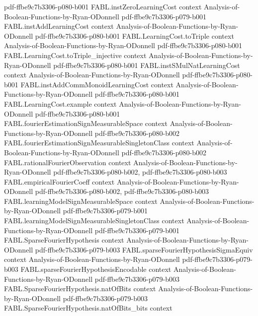 \begin{theorem}
{    pdf-ffbe9c7b3306-p080-b001}
\proofstep
  {FABL.instZeroLearningCost}
  {context}
  {Analysis-of-Boolean-Functions-by-Ryan-ODonnell}
  {pdf-ffbe9c7b3306-p079-b001}
\proofstep
  {FABL.instAddLearningCost}
  {context}
  {Analysis-of-Boolean-Functions-by-Ryan-ODonnell}
  {pdf-ffbe9c7b3306-p080-b001}
\proofstep
  {FABL.LearningCost.toTriple}
  {context}
  {Analysis-of-Boolean-Functions-by-Ryan-ODonnell}
  {pdf-ffbe9c7b3306-p080-b001}
\proofstep
  {FABL.LearningCost.toTriple_injective}
  {context}
  {Analysis-of-Boolean-Functions-by-Ryan-ODonnell}
  {pdf-ffbe9c7b3306-p080-b001}
\proofstep
  {FABL.instSMulNatLearningCost}
  {context}
  {Analysis-of-Boolean-Functions-by-Ryan-ODonnell}
  {pdf-ffbe9c7b3306-p080-b001}
\proofstep
  {FABL.instAddCommMonoidLearningCost}
  {context}
  {Analysis-of-Boolean-Functions-by-Ryan-ODonnell}
  {pdf-ffbe9c7b3306-p080-b001}
\proofstep
  {FABL.LearningCost.example}
  {context}
  {Analysis-of-Boolean-Functions-by-Ryan-ODonnell}
  {pdf-ffbe9c7b3306-p080-b001}
\proofstep
  {FABL.fourierEstimationSignMeasurableSpace}
  {context}
  {Analysis-of-Boolean-Functions-by-Ryan-ODonnell}
  {pdf-ffbe9c7b3306-p080-b002}
\proofstep
  {FABL.fourierEstimationSignMeasurableSingletonClass}
  {context}
  {Analysis-of-Boolean-Functions-by-Ryan-ODonnell}
  {pdf-ffbe9c7b3306-p080-b002}
\proofstep
  {FABL.rationalFourierObservation}
  {context}
  {Analysis-of-Boolean-Functions-by-Ryan-ODonnell}
  {pdf-ffbe9c7b3306-p080-b002,
    pdf-ffbe9c7b3306-p080-b003}
\proofstep
  {FABL.empiricalFourierCoeff}
  {context}
  {Analysis-of-Boolean-Functions-by-Ryan-ODonnell}
  {pdf-ffbe9c7b3306-p080-b002,
    pdf-ffbe9c7b3306-p080-b003}
\proofstep
  {FABL.learningModelSignMeasurableSpace}
  {context}
  {Analysis-of-Boolean-Functions-by-Ryan-ODonnell}
  {pdf-ffbe9c7b3306-p079-b001}
\proofstep
  {FABL.learningModelSignMeasurableSingletonClass}
  {context}
  {Analysis-of-Boolean-Functions-by-Ryan-ODonnell}
  {pdf-ffbe9c7b3306-p079-b001}
\proofstep
  {FABL.SparseFourierHypothesis}
  {context}
  {Analysis-of-Boolean-Functions-by-Ryan-ODonnell}
  {pdf-ffbe9c7b3306-p079-b003}
\proofstep
  {FABL.sparseFourierHypothesisSigmaEquiv}
  {context}
  {Analysis-of-Boolean-Functions-by-Ryan-ODonnell}
  {pdf-ffbe9c7b3306-p079-b003}
\proofstep
  {FABL.sparseFourierHypothesisEncodable}
  {context}
  {Analysis-of-Boolean-Functions-by-Ryan-ODonnell}
  {pdf-ffbe9c7b3306-p079-b003}
\proofstep
  {FABL.SparseFourierHypothesis.natOfBits}
  {context}
  {Analysis-of-Boolean-Functions-by-Ryan-ODonnell}
  {pdf-ffbe9c7b3306-p079-b003}
\proofstep
  {FABL.SparseFourierHypothesis.natOfBits_bits}
  {context}

\end{theorem}
